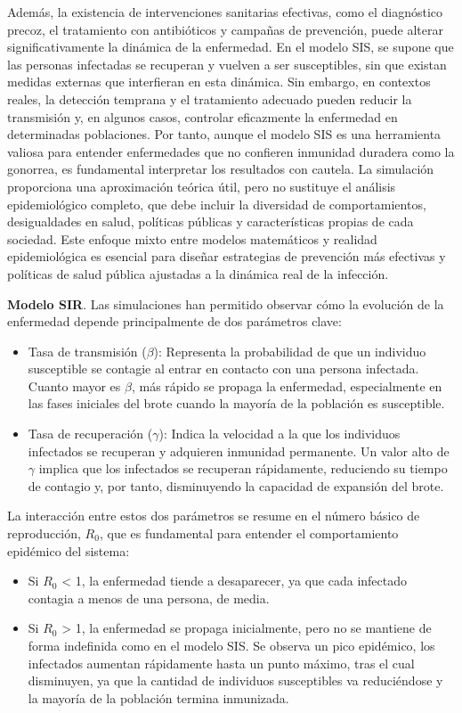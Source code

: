 Además, la existencia de intervenciones sanitarias efectivas, como el diagnóstico precoz, el tratamiento con antibióticos y campañas de prevención, puede alterar significativamente la dinámica de la enfermedad. En el modelo SIS, se supone que las personas infectadas se recuperan y vuelven a ser susceptibles, sin que existan medidas externas que interfieran en esta dinámica. Sin embargo, en contextos reales, la detección temprana y el tratamiento adecuado pueden reducir la transmisión y, en algunos casos, controlar eficazmente la enfermedad en determinadas poblaciones.
Por tanto, aunque el modelo SIS es una herramienta valiosa para entender enfermedades que no confieren inmunidad duradera como la gonorrea, es fundamental interpretar los resultados con cautela. La simulación proporciona una aproximación teórica útil, pero no sustituye el análisis epidemiológico completo, que debe incluir la diversidad de comportamientos, desigualdades en salud, políticas públicas y características propias de cada sociedad.
Este enfoque mixto entre modelos matemáticos y realidad epidemiológica es esencial para diseñar estrategias de prevención más efectivas y políticas de salud pública ajustadas a la dinámica real de la infección.

\vspace{2em}

\textbf{Modelo SIR}. Las simulaciones han permitido observar cómo la evolución de la enfermedad depende principalmente de dos parámetros clave:
\begin{itemize}
    \item Tasa de transmisión ($\beta$): Representa la probabilidad de que un individuo susceptible se contagie al entrar en contacto con una persona infectada. Cuanto mayor es $\beta$, más rápido se propaga la enfermedad, especialmente en las fases iniciales del brote cuando la mayoría de la población es susceptible.
    \item Tasa de recuperación ($\gamma$): Indica la velocidad a la que los individuos infectados se recuperan y adquieren inmunidad permanente. Un valor alto de $\gamma$ implica que los infectados se recuperan rápidamente, reduciendo su tiempo de contagio y, por tanto, disminuyendo la capacidad de expansión del brote.
\end{itemize}
	
La interacción entre estos dos parámetros se resume en el número básico de reproducción, $R_0$, que es fundamental para entender el comportamiento epidémico del sistema:
\begin{itemize}
    \item Si $R_0$ < 1, la enfermedad tiende a desaparecer, ya que cada infectado contagia a menos de una persona, de media.
    \item Si $R_0$ > 1, la enfermedad se propaga inicialmente, pero no se mantiene de forma indefinida como en el modelo SIS. Se observa un pico epidémico, los infectados aumentan rápidamente hasta un punto máximo, tras el cual disminuyen, ya que la cantidad de individuos susceptibles va reduciéndose y la mayoría de la población termina inmunizada.
\end{itemize}
	
